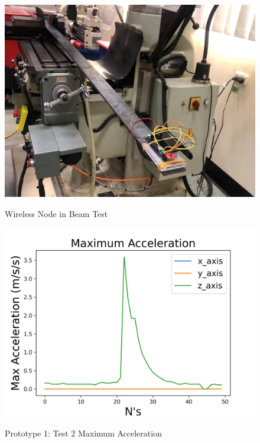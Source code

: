 \begin{figure}[H]
	\centering
	\caption{Wireless Node in Beam Test}
	\includegraphics[width=.8\textwidth]{Sections/Prototype-Testing/beam-test-wireless.png}
	\label{beam-test-wireless}
\end{figure}

\begin{figure}[H]
	\centering
	\caption{Prototype 1: Test 2 Maximum Acceleration}
	\includegraphics[width=.9\textwidth]{Sections/Prototype-Testing/test2-ma.png}
	\label{proto1-test2-ma}
\end{figure}

